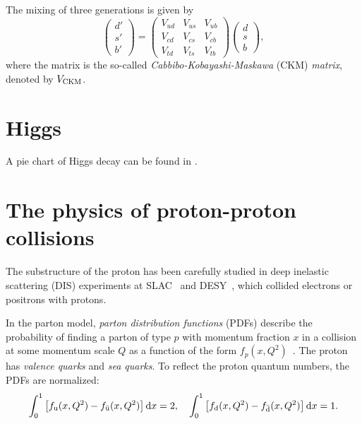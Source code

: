 The mixing of three generations is given by
\begin{equation} \label{eq:CKM_matrix}
  \begin{pmatrix}
     d' \\
     s' \\
     b'
  \end{pmatrix} = \begin{pmatrix}
     V_{ud} & V_{us} & V_{ub} \\
     V_{cd} & V_{cs} & V_{cb} \\
     V_{td} & V_{ts} & V_{tb}
  \end{pmatrix} \begin{pmatrix}
     d \\
     s \\
     b
  \end{pmatrix},
\end{equation}
where the matrix is the so-called \emph{Cabbibo-Kobayashi-Maskawa} (CKM) \emph{matrix}, denoted by $V_\mathrm{CKM}$.


\section{Higgs} \label{sec:Higgs}

A pie chart of Higgs decay can be found in .





\section{The physics of proton-proton collisions} \label{sec:pp_collisions}

The substructure of the proton has been carefully studied in deep inelastic scattering (DIS) experiments at SLAC~\cite{DIS_SLAC1,DIS_SLAC2} and DESY~\cite{DIS_HERA}, which collided electrons or positrons with protons.

In the parton model, \emph{parton distribution functions} (PDFs) describe the probability of finding a parton of type $p$ with momentum fraction $x$ in a collision at some momentum scale $Q$ as a function of the form $f_p(x,Q^2)$~\cite{parton_model1,parton_model2,parton_model_pp,pdfs,LHC_pdfs}.
The proton has \emph{valence quarks} and \emph{sea quarks}.
To reflect the proton quantum numbers, the PDFs are normalized:
\begin{equation}
  \int_0^1 \left[ f_{\text{u}}(x,Q^2) - f_{\bar{\text{u}}}(x,Q^2) \right] \dd{x} = 2, \quad
  \int_0^1 \left[ f_{\text{d}}(x,Q^2) - f_{\bar{\text{d}}}(x,Q^2) \right] \dd{x} = 1.
\end{equation}


